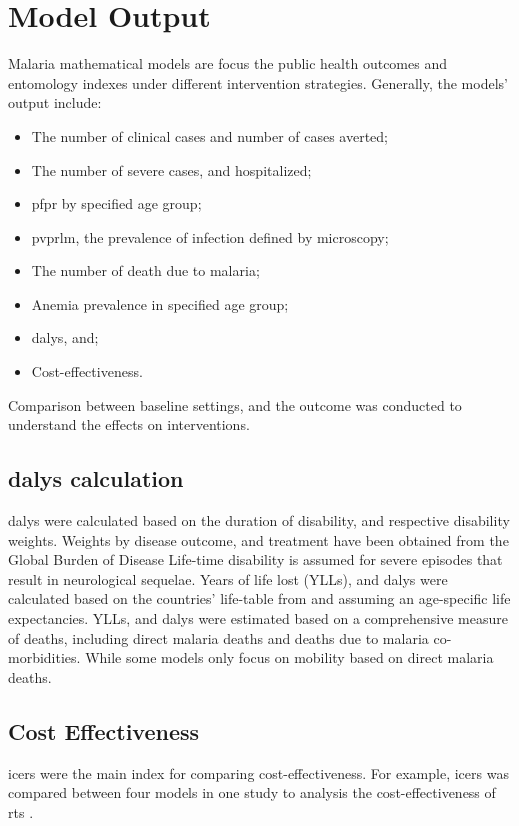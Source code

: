 \documentclass[a4paper, 12pt, twoside]{report}
\begin{document}
\section{Model Output}%
\label{sec:model_output}

Malaria mathematical models are focus the public health outcomes and entomology indexes under different intervention strategies.
Generally, the models’ output include:
\begin{itemize}
	\item The number of clinical cases and number of cases averted;
	\item The number of severe cases, and hospitalized;
  \item \gls{pfpr}\cite{Penny2016} by specified age group; 
  \item \gls{pvprlm}, the prevalence of infection defined by microscopy;
	\item The number of death due to malaria;
  \item Anemia prevalence in specified age group;
	\item \gls{dalys}, and;
	\item Cost-effectiveness.
\end{itemize}
Comparison between baseline settings, and the outcome was conducted to understand the effects on interventions.

\subsection{\texorpdfstring{\gls{dalys} calculation}{DALYs Calculation}}%
\label{sub:dalys_calcualtion}
\gls{dalys} were calculated based on the duration of disability, and respective disability weights.
Weights by disease outcome, and treatment have been obtained from the Global Burden of Disease Life-time disability is assumed for severe episodes that result in neurological sequelae.
Years of life lost (YLLs), and \gls{dalys} were calculated based on the countries' life-table from and assuming an age-specific life expectancies. 
YLLs, and \gls{dalys} were estimated based on a comprehensive measure of deaths, including direct malaria deaths and deaths due to malaria co-morbidities.
While some models only focus on mobility based on direct malaria deaths.

\subsection{Cost Effectiveness}%
\label{sub:cost_effectiveness}
\gls{icers} were the main index for comparing cost-effectiveness.
For example, \gls{icers} was compared between four models in one study to analysis the cost-effectiveness of \gls{rts} \cite{Hay2004}.
\end{document}
